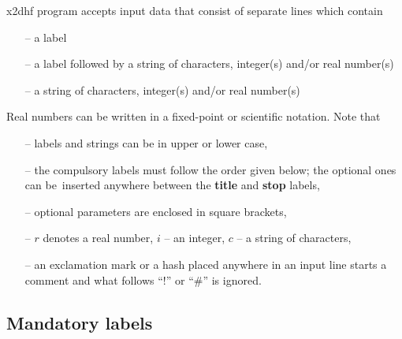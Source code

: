 \documentclass[12pt,a4paper]{article}
\begin{document}
x2dhf program accepts input data that consist of separate lines which contain
\begin{itemize}
\item[--] a label 
\item[--] a label followed by a string of characters, integer(s)
  and/or real number(s)
\item[--] a string of characters, integer(s) and/or real number(s) 
\end{itemize}
Real numbers can be written in a fixed-point or scientific notation. 
\noindent
Note that
\begin{itemize}
\item[--] labels and strings can be in upper or lower case,
        

\item[--] the compulsory labels must follow the order given below; the
  optional ones can be~inserted anywhere between the \textbf{title}
  and \textbf{stop} labels,

\item[--] optional parameters are enclosed in square brackets,

\item[--] $r$ denotes a real number, $i$ -- an integer, $c$ -- a string
          of characters,

\item[--] an exclamation mark or a hash placed anywhere in an input
  line starts a comment and what follows ``!'' or ``\#'' is ignored.

\end{itemize}

\noindent
\subsection{Mandatory labels}
\end{document}
